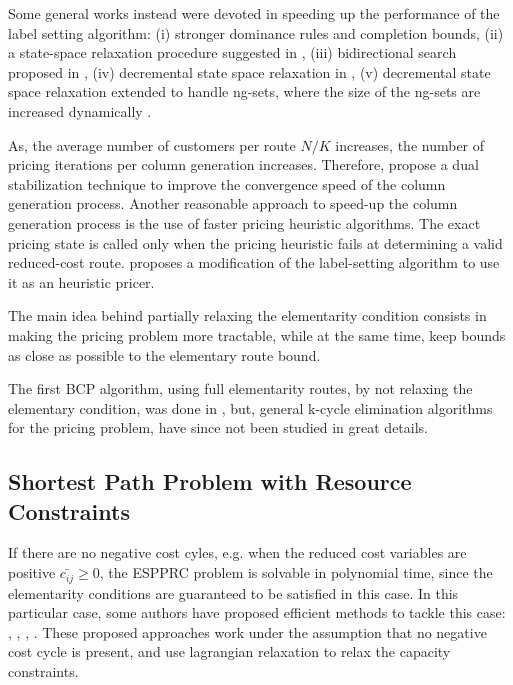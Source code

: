 Some general works instead were devoted in speeding up the performance of the label
setting algorithm:
(i) stronger dominance rules and completion bounds,
(ii) a state-space relaxation procedure suggested in \textcite{christofides1981a},
(iii) bidirectional search proposed in \textcite{righini2006},
(iv) decremental state space relaxation in \textcite{boland2006, righini2008},
(v) decremental state space relaxation extended to handle ng-sets,
where the size of the ng-sets are increased dynamically \textcite{martinelli2014}.


As, the average number of customers per route $N / K$ increases,
the number of pricing iterations per column generation increases.
Therefore, \textcite{dumerle1999, pessoa2013} propose a dual stabilization
technique to improve the convergence speed of the column generation process.
Another reasonable approach to speed-up the column generation process
is the use of faster pricing heuristic algorithms. The exact
pricing state is called only when the pricing heuristic fails
at determining a valid reduced-cost route.
\textcite{fukasawa2006} proposes a modification of the label-setting
algorithm to use it as an heuristic pricer.



The main idea behind partially relaxing the elementarity condition consists
in making the pricing problem more tractable, while at the same time,
keep bounds as close as possible to the elementary route bound.


The first BCP algorithm, using full elementarity routes, by not relaxing the elementary
condition, was done in \cite{chabrier2006},
but, general k-cycle elimination algorithms for the pricing problem, have since not been studied
in great details.

\subsection{Shortest Path Problem with Resource Constraints}
If there are no negative cost cyles, e.g. when the reduced cost variables are positive $\bar{c_{ij}} \ge 0$,
the ESPPRC problem is solvable in polynomial time, since the elementarity conditions are guaranteed
to be satisfied in this case.
In this particular case, some authors have proposed efficient methods to tackle this case:
\cite{beasley1989}, \cite{carlyle2008}, \cite{dumitrescu2003}, \cite{muhandiramge2009}.
These proposed approaches work under the assumption that no negative cost cycle is present,
and use lagrangian relaxation to relax the capacity constraints.


